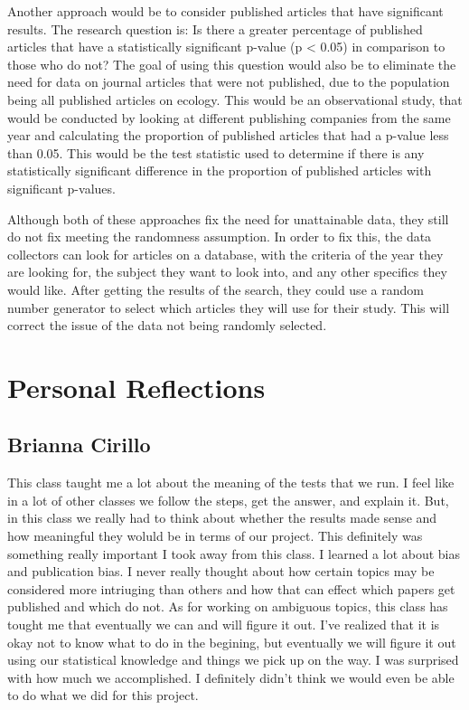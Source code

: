 \documentclass[12pt, letterpaper]{article}
\begin{document}
Another approach would be to consider published articles that have significant results. The research question is: Is there a greater percentage of published articles that have a statistically significant p-value (p < 0.05) in comparison to those who do not? The goal of using this question would also be to  eliminate the need for data on journal articles that were not published, due to the population being all published articles on ecology. This would be an observational study, that would be conducted by looking at different publishing companies from the same year and calculating the proportion of published articles that had a p-value less than 0.05. This would be the test statistic used to determine if there is any statistically significant difference in the proportion of published articles with significant p-values. 

Although both of these approaches fix the need for unattainable data, they still do not fix meeting the randomness assumption. In order to fix this, the data collectors can look for articles on a database, with the criteria of the year they are looking for, the subject they want to look into, and any other specifics they would like. After getting the results of the search, they could use a random number generator to select which articles they  will use for their study. This will correct the issue of the data not being randomly selected.

\section{Personal Reflections}
\subsection{Brianna Cirillo}
This class taught me a lot about the meaning of the tests that we run. I feel like in a lot of other classes we follow the steps, get the answer, and explain it. But, in this class we really had to think about whether the results made sense and how meaningful they woluld be in terms of our project. This definitely was something really important I took away from this class. I learned a lot about bias and publication bias. I never really thought about how certain topics may be considered more intriuging than others and how that can effect which papers get published and which do not. As for working on ambiguous topics, this class has tought me that eventually we can and will figure it out. I've realized that it is okay not to know what to do in the begining, but eventually we will figure it out using our statistical knowledge and things we pick up on the way. I was surprised with how much we accomplished. I definitely didn't think we would even be able to do what we did for this project.  
\end{document}
